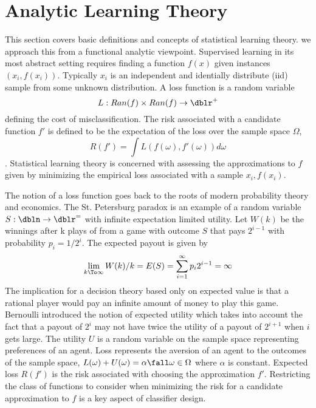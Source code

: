 \section*{Analytic Learning Theory}
This section covers basic definitions and concepts of statistical learning theory.  we approach this from a functional analytic viewpoint.
Supervised learning in its most abstract setting requires finding a function $f(x)$ given instances ${ (x_i ,f(x_i))}$. Typically ${x_i}$ is an independent and identially distribute (iid) sample from some unknown distribution.  A loss function is a random variable
\[ L : Ran(f) \times Ran(f) \rightarrow \dblr^+\]
 defining the cost of misclassification.  The risk associated with a candidate function $f'$ is defined to be the expectation of the loss over the sample space $\Omega$,
\begin{equation*} R(f')=\int L( f(\omega), f'(\omega)) d\omega\end{equation*}.
Statistical learning theory is concerned with assessing the approximations to $f$ given by minimizing the empirical loss associated with a sample ${x_i ,f(x_i)}$.

The notion of a loss function goes back to the roots of modern probability theory and economics.  The St. Petersburg paradox is an example of a random variable $S : \dbln \rightarrow \dblr^=$ with infinite expectation limited utility. Let $W(k)$ be the winnings after k plays of from a game with outcome $S$ that pays $2^{i-1}$ with probability $p_i=1/2^i$. The expected payout is given by
\begin{equation*}
\lim_{k\To\infty} W(k)/k =E(S)=\sum\limits_{i=1}^{\infty} p_i 2^{i-1}= \infty
\end{equation*} The implication for a decision theory based only on expected value is that a rational player would pay an infinite amount of money to play this game. Bernoulli introduced the notion of expected utility which takes into account the fact that a payout of $2^i$ may not have twice the utility of a payout of $2^{i+1}$ when $i$ gets large.  The utility $U$ is a random variable on the sample space representing preferences of an agent.  Loss represents the aversion of an agent to the outcomes of the sample space, $L(\omega)+U(\omega) = \alpha \fall \omega \in \Omega$ where $\alpha$ is constant.  Expected loss $R(f')$ is the risk associated with choosing the approximation $f'$. Restricting the class of functions to consider when minimizing the risk for a candidate approximation to $f$ is a key aspect of classifier design.

